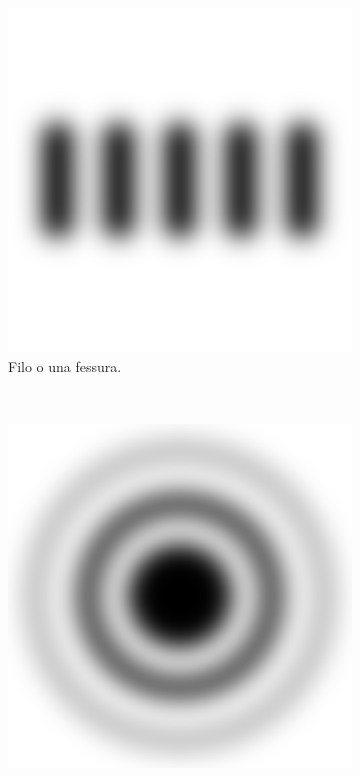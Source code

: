 \begin{figure}[t]
    \centering
    \begin{subfigure}[b]{0.3\textwidth}
        \includegraphics[width=\textwidth]{f1.png}
        \caption{Filo o una fessura.}
        \label{fig:ff}
    \end{subfigure}%
    ~ %
    \begin{subfigure}[b]{0.3\textwidth}
        \includegraphics[width=\textwidth]{f2.png}

\end{subfigure}
\end{figure}
